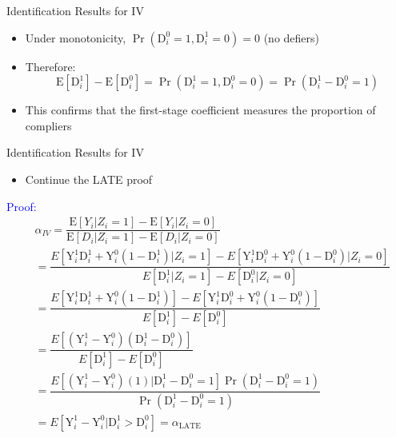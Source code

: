 \documentclass[dvipsnames,hyperref={pdfpagelabels=false}]{beamer}
\begin{document}
\begin{frame}{Identification Results for IV}
\begin{itemize}
\begin{equation*}
		\end{equation*}
		\vspace{0.2cm}
		\item Under monotonicity, $\Pr(\mathrm{D}^{0}_{i}=1, \mathrm{D}^{1}_{i}=0) = 0$ (no defiers)
		\vspace{0.2cm}
		\item Therefore:
		\begin{equation*}
			\mathrm{E}[\mathrm{D}^{1}_{i}]-\mathrm{E}[\mathrm{D}^{0}_{i}] = \Pr(\mathrm{D}^{1}_{i}=1, \mathrm{D}^{0}_{i}=0) = \Pr(\mathrm{D}^{1}_{i}-\mathrm{D}^{0}_{i}=1)
		\end{equation*}
		\item This confirms that the first-stage coefficient measures the proportion of compliers
	\end{itemize}
\end{frame}





\begin{frame}{Identification Results for IV}
	\begin{itemize}
		\item Continue the LATE proof
	\end{itemize}			
	\vspace{0.2cm}
	\textcolor{blue}{Proof:}
	\begin{equation*}
	\begin{aligned}
	&\alpha_{IV}=\dfrac{\mathrm{E}[Y_{i}|Z_{i}=1]-\mathrm{E}[Y_{i}|Z_{i}=0]}{\mathrm{E}[D_{i}|Z_{i}=1]-\mathrm{E}[D_{i}|Z_{i}=0]}  \\
	&= \dfrac{E[\mathrm{Y}^{1}_{i} \mathrm{D}^{1}_{i}+\mathrm{Y}^{0}_{i}(1-\mathrm{D}^{1}_{i})|Z_{i}=1]-E[\mathrm{Y}^{1}_{i} \mathrm{D}^{0}_{i}+\mathrm{Y}^{0}_{i} (1-\mathrm{D}^{0}_{i})|Z_{i}=0]}{E[\mathrm{D}^{1}_{i}|Z_{i}=1]-E[\mathrm{D}^{0}_{i}|Z_{i}=0]}  \\
	&= \dfrac{E[\mathrm{Y}^{1}_{i} \mathrm{D}^{1}_{i}+\mathrm{Y}^{0}_{i}(1-\mathrm{D}^{1}_{i})]-E[\mathrm{Y}^{1}_{i} \mathrm{D}^{0}_{i}+\mathrm{Y}^{0}_{i}(1-\mathrm{D}^{0}_{i})]}{E[\mathrm{D}^{1}_{i}]-E[\mathrm{D}^{0}_{i}]}\\
	&= \dfrac{E[(\mathrm{Y}^{1}_{i}-\mathrm{Y}^{0}_{i})(\mathrm{D}^{1}_{i}-\mathrm{D}^{0}_{i})]}{E[\mathrm{D}^{1}_{i}]-E[\mathrm{D}^{0}_{i}]}\\
	&= \dfrac{E[(\mathrm{Y}^{1}_{i}-\mathrm{Y}^{0}_{i}) (1)|\mathrm{D}^{1}_{i}-\mathrm{D}^{0}_{i}=1] \Pr(\mathrm{D}^{1}_{i}-\mathrm{D}^{0}_{i}=1)}{\Pr(\mathrm{D}^{1}_{i}-\mathrm{D}^{0}_{i}=1)}\\
	&= E[\mathrm{Y}^{1}_{i}-\mathrm{Y}^{0}_{i}|\mathrm{D}^{1}_{i}>\mathrm{D}^{0}_{i}] = \alpha_{\text{LATE}}
	\end{aligned}
	\end{equation*}
	
\end{frame}
\end{document}
